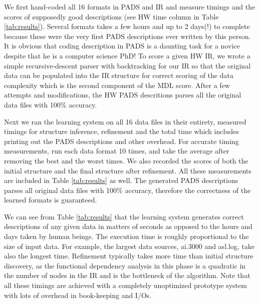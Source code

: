 We first hand-coded all 16 formats in PADS and IR and measure timings and the scores 
of supposedly good descriptions (see HW time column in Table \ref{tab:results}). 
Several formats takes a few hours and up to 2 days(!) to complete because these were the very first 
PADS descriptions ever written by this person. It is obvious that coding description
in PADS is a daunting task for a novice despite that he is a computer science PhD!
To score a given HW IR, we wrote a simple recursive-descent parser with backtracking
for our IR so that the original data can be populated into the IR structure for
correct scoring of the data complexity which is the second component of the MDL score.
After a few attempts and modifications, the HW PADS descritions parses all 
the original data files with 100\% accuracy.

Next we ran the learning system on all 16 data files in their entirety, 
measured timings for structure inference, refinement and the total time which includes
printing out the PADS descriptions and other overhead. 
For accurate timing measurements, run each data format 10 times, and take the average 
after removing the best and the worst times.
We also recorded the scores of both the initial structure and the final structure after refinement.
All these measurements are included in Table \ref{tab:results} as well.
The generated PADS descriptions parses all original data files with 100\% accuracy,
therefore the correctness of the learned formats is guaranteed.

We can see from Table \ref{tab:results} that the learning system
generates correct descriptions of any given data in matters of seconds as opposed to
the hours and days taken by human beings. The execution time is roughly proportional
to the size of input data. For example, the largest data sources, ai.3000 and asl.log,
take also the longest time. Refinement typically takes more time than initial
structure discovery, as the functional dependency analysis in this phase is a quadratic
in the number of nodes in the IR and is the bottleneck of the algorithm. 
Note that all these timings are achieved with a completely unoptimized prototype system
with lots of overhead in book-keeping and I/Os.



